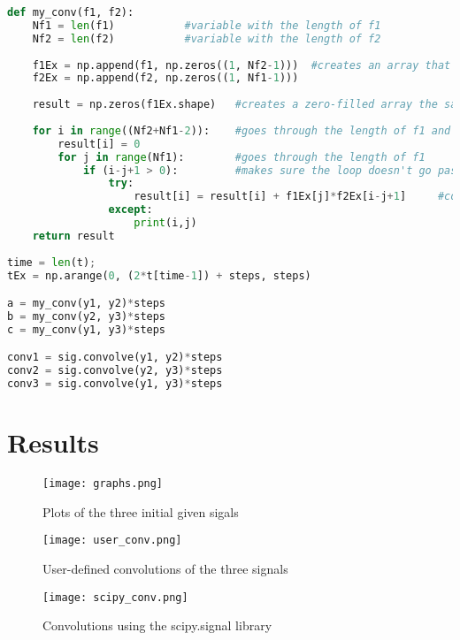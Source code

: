 \documentclass[12pt]{report}
\begin{document}
\begin{lstlisting}[language=Python, caption=Defining the function for convolution]
def my_conv(f1, f2):
    Nf1 = len(f1)           #variable with the length of f1
    Nf2 = len(f2)           #variable with the length of f2
    
    f1Ex = np.append(f1, np.zeros((1, Nf2-1)))  #creates an array that is the same size as f1 and f2
    f2Ex = np.append(f2, np.zeros((1, Nf1-1)))
    
    result = np.zeros(f1Ex.shape)   #creates a zero-filled array the same size as both functions
    
    for i in range((Nf2+Nf1-2)):    #goes through the length of f1 and f2
        result[i] = 0
        for j in range(Nf1):        #goes through the length of f1
            if (i-j+1 > 0):         #makes sure the loop doesn't go past 0 entries
                try: 
                    result[i] = result[i] + f1Ex[j]*f2Ex[i-j+1]     #combines the previous results with the product of the new entries
                except:
                    print(i,j)
    return result
    
time = len(t);
tEx = np.arange(0, (2*t[time-1]) + steps, steps)

a = my_conv(y1, y2)*steps
b = my_conv(y2, y3)*steps
c = my_conv(y1, y3)*steps

conv1 = sig.convolve(y1, y2)*steps
conv2 = sig.convolve(y2, y3)*steps
conv3 = sig.convolve(y1, y3)*steps
\end{lstlisting}

\section{Results}

\begin{figure}[htp]
    \centering
    \texttt{[image: graphs.png]}
    \caption{Plots of the three initial given sigals}
\end{figure}

\begin{figure}[htp]
    \centering
    \texttt{[image: user\_conv.png]}
    \caption{User-defined convolutions of the three signals}
\end{figure}

\begin{figure}[htp]
    \centering
    \texttt{[image: scipy\_conv.png]}
    \caption{Convolutions using the scipy.signal library}
\end{figure}
\end{document}
